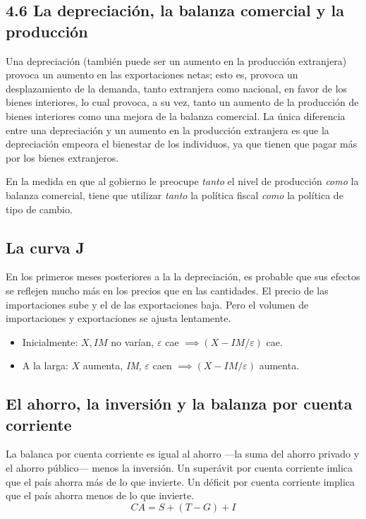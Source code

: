 \documentclass[10pt]{article}
\begin{document}
\begin{multicols*}{2}
\subsection{4.6 La depreciación, la balanza comercial y la producción}
Una depreciación (también puede ser un aumento en la producción extranjera) provoca un aumento en las exportaciones netas; esto es, provoca un desplazamiento de la demanda, tanto extranjera como nacional, en favor de los bienes interiores, lo cual provoca, a su vez, tanto un aumento de la producción de bienes interiores como una mejora de la balanza comercial. La única diferencia entre una depreciación y un aumento en la producción extranjera es que la depreciación empeora el bienestar de los individuos, ya que tienen que pagar más por los bienes extranjeros.

En la medida en que al gobierno le preocupe \textit{tanto} el nivel de producción \textit{como} la balanza comercial, tiene que utilizar \textit{tanto} la política fiscal \textit{como} la política de tipo de cambio.

\subsection{La curva J}
En los primeros meses posteriores a la la depreciación, es probable que sus efectos se reflejen mucho más en los precios que en las cantidades. El precio de las importaciones sube y el de las exportaciones baja. Pero el volumen de importaciones y exportaciones se ajusta lentamente.

\begin{itemize}
    \item Inicialmente: $X, \textit{IM}$ no varían, $\varepsilon$ cae $\implies (X - \textit{IM}/\varepsilon)$ cae.
    \item A la larga: $X$ aumenta, \textit{IM}, $\varepsilon$ caen $\implies (X - \textit{IM}/\varepsilon)$ aumenta.
\end{itemize}

\subsection{El ahorro, la inversión y la balanza por cuenta corriente}
La balanca por cuenta corriente es igual al ahorro ---la suma del ahorro privado y el ahorro público--- menos la inversión. Un superávit por cuenta corriente imlica que el país ahorra más de lo que invierte. Un déficit por cuenta corriente implica que el país ahorra menos de lo que invierte.
\[ \textit{CA} = S + (T-G) + I \]


\end{multicols*}
\end{document}
